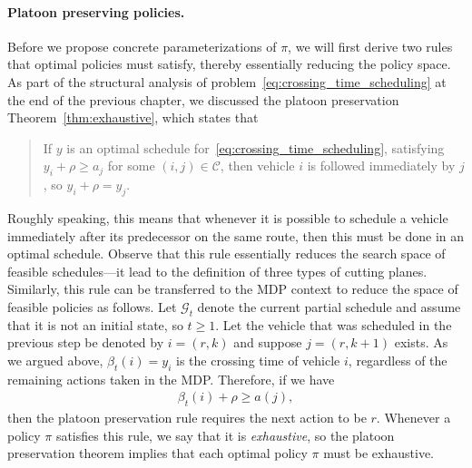 \documentclass[a4paper]{report}
\theoremstyle{definition}
\theoremstyle{plain}
\begin{document}


\paragraph{Platoon preserving policies.}

Before we propose concrete parameterizations of $\pi$, we will first derive two
rules that optimal policies must satisfy, thereby essentially reducing the
policy space.
%
As part of the structural analysis of problem~\eqref{eq:crossing_time_scheduling} at the end of the previous
chapter, we discussed the platoon preservation Theorem~\ref{thm:exhaustive}, which states that
\begin{quote}
  If $y$ is an optimal schedule for~\eqref{eq:crossing_time_scheduling}, satisfying $y_{i} + \rho \geq a_{j}$ for some
  $(i,j) \in \mathcal{C}$, then vehicle $i$ is followed immediately by $j$, so
  $y_{i} + \rho = y_{j}$.
\end{quote}
%
Roughly speaking, this means that whenever it is possible to schedule a vehicle
immediately after its predecessor on the same route, then this must be done in
an optimal schedule.
%
Observe that this rule essentially reduces the search space of feasible
schedules---it lead to the definition of three types of cutting planes.
%
Similarly, this rule can be transferred to the MDP context to reduce the space
of feasible policies as follows. Let $\mathcal{G}_t$ denote the current partial
schedule and assume that it is not an initial state, so $t \geq 1$. Let the
vehicle that was scheduled in the previous step be denoted by $i = (r, k)$ and
suppose $j = (r, k+1)$ exists.
%
As we argued above, $\beta_t(i) = y_{i}$ is the crossing time of vehicle $i$,
regardless of the remaining actions taken in the MDP.
%
Therefore, if we have
\begin{align}\label{eq:rule-exhaustive}
  \beta_t(i) + \rho \geq a(j),
\end{align}
then the platoon preservation rule requires the next action to be $r$.
%
Whenever a policy $\pi$ satisfies this rule, we say that it is
\emph{exhaustive}, so the platoon preservation theorem implies that each optimal
policy $\pi$ must be exhaustive.
\end{document}
